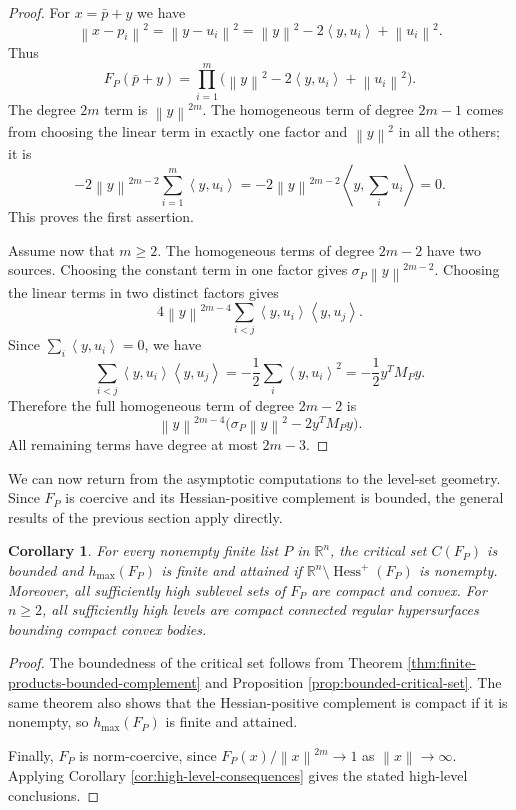 \documentclass[11pt]{amsart}
\newtheorem{corollary}[theorem]{Corollary}
\theoremstyle{remark}
\newcommand{\Hessp}{\operatorname{Hess}^{+}}
\newcommand{\R}{\mathbb{R}}
\newcommand{\ip}[2]{\left\langle #1,#2\right\rangle}
\newcommand{\norm}[1]{\left\lVert #1\right\rVert}
\begin{document}
\begin{proof}
For $x=\bar p+y$ we have
\[
 \norm{x-p_i}^2=\norm{y-u_i}^2
 =\norm{y}^2-2\ip{y}{u_i}+\norm{u_i}^2.
\]
Thus
\[
 F_P(\bar p+y)
 =\prod_{i=1}^m
  \bigl(\norm{y}^2-2\ip{y}{u_i}+\norm{u_i}^2\bigr).
\]
The degree $2m$ term is $\norm{y}^{2m}$. The homogeneous term of degree
$2m-1$ comes from choosing the linear term in exactly one factor and
$\norm{y}^2$ in all the others; it is
\[
 -2\norm{y}^{2m-2}\sum_{i=1}^m\ip{y}{u_i}
 =-2\norm{y}^{2m-2}\ip{y}{\sum_i u_i}=0.
\]
This proves the first assertion.

Assume now that $m\ge2$. The homogeneous terms of degree $2m-2$ have two
sources. Choosing the constant term in one factor gives
$\sigma_P\norm{y}^{2m-2}$. Choosing the linear terms in two distinct factors
gives
\[
 4\norm{y}^{2m-4}\sum_{i<j}\ip{y}{u_i}\ip{y}{u_j}.
\]
Since $\sum_i\ip{y}{u_i}=0$, we have
\[
 \sum_{i<j}\ip{y}{u_i}\ip{y}{u_j}
 =-\frac12\sum_i\ip{y}{u_i}^2
 =-\frac12 y^T M_Py.
\]
Therefore the full homogeneous term of degree $2m-2$ is
\[
 \norm{y}^{2m-4}
 \bigl(\sigma_P\norm{y}^2-2y^T M_Py\bigr).
\]
All remaining terms have degree at most $2m-3$.
\end{proof}

We can now return from the asymptotic computations to the level-set geometry. Since $F_P$ is coercive and its Hessian-positive complement is bounded, the general results of the previous section apply directly.

\begin{corollary}\label{cor:finite-products-high-levels}
For every nonempty finite list $P$ in $\R^n$, the critical set $C(F_P)$ is
bounded and $h_{\max}(F_P)$ is finite and attained if
$\R^n\setminus\Hessp(F_P)$ is nonempty. Moreover, all sufficiently high
sublevel sets of $F_P$ are compact and convex. For $n\ge2$, all sufficiently
high levels are compact connected regular hypersurfaces bounding compact convex
bodies.
\end{corollary}



\begin{proof}
The boundedness of the critical set follows from Theorem
\ref{thm:finite-products-bounded-complement} and Proposition
\ref{prop:bounded-critical-set}. The same theorem also shows that the
Hessian-positive complement is compact if it is nonempty, so $h_{\max}(F_P)$ is
finite and attained.

Finally, $F_P$ is norm-coercive, since
$F_P(x)/\norm{x}^{2m}\to1$ as $\norm{x}\to\infty$. Applying Corollary
\ref{cor:high-level-consequences} gives the stated high-level conclusions.
\end{proof}
\end{document}

